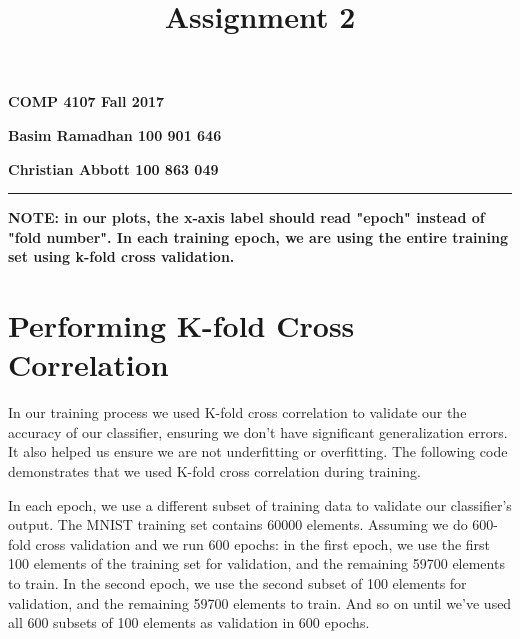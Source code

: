 \documentclass[11pt]{article}
\title{Assignment 2}
\begin{document}
    
    
    \maketitle
    
    

    
\begin{center}
\textbf{COMP 4107 Fall 2017}

\textbf{Basim Ramadhan 100 901 646}

\textbf{Christian Abbott 100 863 049}
\end{center}

\begin{center}\rule{0.5\linewidth}{\linethickness}\end{center}

\textbf{NOTE: in our plots, the x-axis label should read "epoch"
instead of "fold number". In each training epoch, we are using the
entire training set using k-fold cross
validation.}\label{note-in-our-plots-the-x-axis-label-should-read-epoch-instead-of-fold-number.-in-each-training-epoch-we-are-using-the-entire-training-set-using-k-fold-cross-validation.}

    \section{Performing K-fold Cross
Correlation}\label{performing-k-fold-cross-correlation}

In our training process we used K-fold cross correlation to validate our
the accuracy of our classifier, ensuring we don't have significant
generalization errors. It also helped us ensure we are not underfitting
or overfitting. The following code demonstrates that we used K-fold
cross correlation during training.

In each epoch, we use a different subset of training data to validate
our classifier's output. The MNIST training set contains 60000 elements.
Assuming we do 600-fold cross validation and we run 600 epochs: in the
first epoch, we use the first 100 elements of the training set for
validation, and the remaining 59700 elements to train. In the second
epoch, we use the second subset of 100 elements for validation, and the
remaining 59700 elements to train. And so on until we've used all 600
subsets of 100 elements as validation in 600 epochs.
\end{document}
